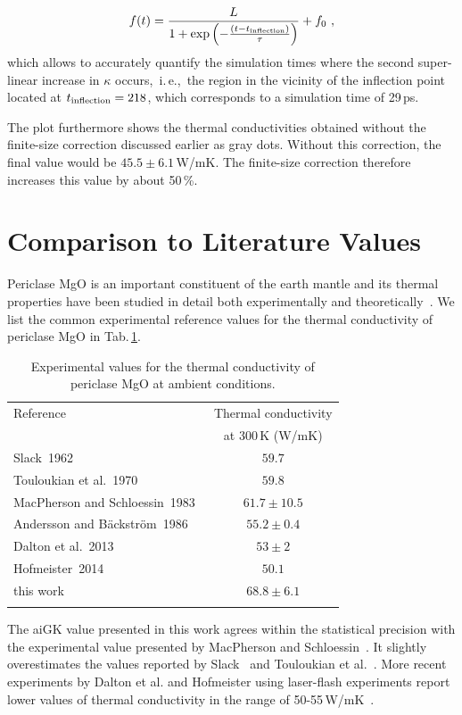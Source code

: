 \begin{align}
	f(t) 
		= \frac{L}{1 + \exp \left(-\frac{(t-t_{\rm inflection})}{\tau} \right)} + f_0~,
	\label{eq:imp.f_logistic}
\end{align}
which allows to accurately quantify the simulation times where the second super-linear increase in $\kappa$ occurs,~i.\,e.,~the region in the vicinity of the inflection point located at $t_{\rm inflection} = 218$, which corresponds to a simulation time of 29\,ps.

The plot furthermore shows the thermal conductivities obtained without the finite-size correction discussed earlier as gray dots. Without this correction, the final value would be $45.5 \pm 6.1$\,W/mK. The finite-size correction therefore increases this value by about 50\,\%.

\section{Comparison to Literature Values}
Periclase MgO is an important constituent of the earth mantle and its thermal properties have been studied in detail both experimentally and theoretically~\cite{charvat1957,slack1962,touloukian1970,Macpherson1983,Koker2009,Stackhouse2010,tang2010,dekura2017}. We list the common experimental reference values for the thermal conductivity of periclase MgO in Tab.\,\ref{tab:exp.MgO}.
\begin{table}[ht]
  \centering
  \selectfont
  \begin{tabular}{lc}
    \toprule
    Reference & Thermal conductivity \\
    & at 300\,K (W/mK) \\
    \midrule
    Slack~1962~\cite{slack1962} & $59.7$ \\
    Touloukian et al.~1970~\cite{touloukian1970} & $59.8$ \\
    MacPherson and Schloessin~1983~\cite{Macpherson1983} & $61.7 \pm 10.5$ \\
    Andersson and B\"ackstr\"om~1986~\cite{andersson1986} & $55.2 \pm 0.4$ \\
    Dalton et al.~2013~\cite{dalton2013} & $53 \pm 2$ \\
    Hofmeister~2014~\cite{hofmeister2014} & $50.1$ \\
    this work & $68.8 \pm 6.1$ \\
    \bottomrule
    \vspace{.5em}
  \end{tabular}
  \caption{Experimental values for the thermal conductivity of periclase MgO at ambient conditions. %
  }
  \label{tab:exp.MgO}
\end{table}
The aiGK value presented in this work agrees within the statistical precision with the experimental value presented by MacPherson and Schloessin~\cite{Macpherson1983}. It slightly overestimates the values reported by Slack~\cite{slack1962} and Touloukian et al.~\cite{touloukian1970}. More recent experiments by Dalton et al. and Hofmeister using laser-flash experiments report lower values of thermal conductivity in the range of 50-55\,W/mK~\cite{dalton2013,hofmeister2014}.

